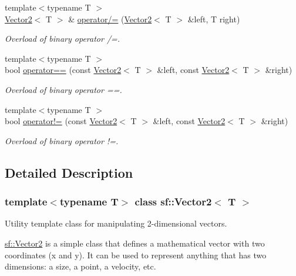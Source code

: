 \begin{DoxyCompactItemize}
{\footnotesize template$<$typename T $>$ }\\\hyperlink{classsf_1_1_vector2}{Vector2}$<$ T $>$ \& \hyperlink{classsf_1_1_vector2_ac4d293c9dc7954ccfd5e373972f38b03}{operator/=} (\hyperlink{classsf_1_1_vector2}{Vector2}$<$ T $>$ \&left, T right)
\begin{DoxyCompactList}\small\item\em Overload of binary operator /=. \end{DoxyCompactList}\item 
{\footnotesize template$<$typename T $>$ }\\bool \hyperlink{classsf_1_1_vector2_a9a7b2d36c3850828fdb651facfd25136}{operator==} (const \hyperlink{classsf_1_1_vector2}{Vector2}$<$ T $>$ \&left, const \hyperlink{classsf_1_1_vector2}{Vector2}$<$ T $>$ \&right)
\begin{DoxyCompactList}\small\item\em Overload of binary operator ==. \end{DoxyCompactList}\item 
{\footnotesize template$<$typename T $>$ }\\bool \hyperlink{classsf_1_1_vector2_a01673da35ef9c52d0e54b8263549a956}{operator!=} (const \hyperlink{classsf_1_1_vector2}{Vector2}$<$ T $>$ \&left, const \hyperlink{classsf_1_1_vector2}{Vector2}$<$ T $>$ \&right)
\begin{DoxyCompactList}\small\item\em Overload of binary operator !=. \end{DoxyCompactList}\end{DoxyCompactItemize}


\subsection{Detailed Description}
\subsubsection*{template$<$typename T$>$\newline
class sf\+::\+Vector2$<$ T $>$}

Utility template class for manipulating 2-\/dimensional vectors. 

\hyperlink{classsf_1_1_vector2}{sf\+::\+Vector2} is a simple class that defines a mathematical vector with two coordinates (x and y). It can be used to represent anything that has two dimensions\+: a size, a point, a velocity, etc.

